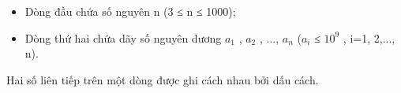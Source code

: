 \begin{itemize}
	\item Dòng đầu chứa số nguyên n (3 ≤ n ≤ 1000);
	\item Dòng thứ hai chứa dãy số nguyên dương $a_{1}$ , $a_{2}$ , ..., $a_{n}$ ($a_{i}$ ≤ $10^{9}$ , i=1, 2,..., n).
\end{itemize}

Hai số liên tiếp trên một dòng được ghi cách nhau bởi dấu cách.